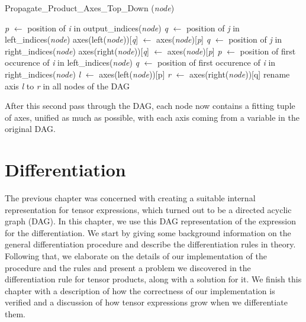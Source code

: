 \documentclass[12pt, a4paper]{report}
\begin{document}
\begin{algorithm}[ht!] %
    \caption{Propagate\_Product\_Axes\_Top\_Down (\textit{node})}
    \label{alg:product_axes_2}
    \begin{algorithmic}
            \State \textit{p} $\gets$ position of \textit{i} in output\_indices(\textit{node})
                \State \textit{q} $\gets$ position of \textit{j} in left\_indices(\textit{node})
                    \State axes(left(\textit{node}))[\textit{q}] $\gets$ axes(\textit{node})[\textit{p}]
                \EndIf
            \EndFor
                \State \textit{q} $\gets$ position of \textit{j} in right\_indices(\textit{node})
                    \State axes(right(\textit{node}))[\textit{q}] $\gets$ axes(\textit{node})[\textit{p}]
                \EndIf
            \EndFor
        \EndFor
         
            \State \textit{p} $\gets$ position of first occurence of \textit{i} in left\_indices(\textit{node})
                \State \textit{q} $\gets$ position of first occurence of \textit{i} in right\_indices(\textit{node})
                \State \textit{l} $\gets$ axes(left(\textit{node}))[p]
                \State \textit{r} $\gets$ axes(right(\textit{node}))[q]
                \State rename axis \textit{l} to \textit{r} in all nodes of the DAG
            \EndIf
        \EndFor
    \end{algorithmic}
\end{algorithm}

After this second pass through the DAG, each node now contains a fitting tuple of axes, unified as much as possible, with each axis coming from a variable in the original DAG.

\FloatBarrier
\chapter{Differentiation}
The previous chapter was concerned with creating a suitable internal representation for tensor expressions, which turned out to be a directed acyclic graph (DAG).
In this chapter, we use this DAG representation of the expression for the differentiation.
We start by giving some background information on the general differentiation procedure and describe the differentiation rules in theory.
Following that, we elaborate on the details of our implementation of the procedure and the rules and present a problem we discovered in the differentiation rule for tensor products, along with a solution for it.
We finish this chapter with a description of how the correctness of our implementation is verified and a discussion of how tensor expressions grow when we differentiate them.
\end{document}
